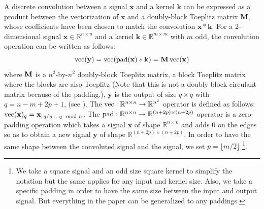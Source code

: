 A discrete convolution between a signal $\mathbf{x}$ and a kernel $\mathbf{k}$ can be expressed as a  product between the vectorization of $\mathbf{x}$ and a doubly-block Toeplitz matrix $\textbf{M}$, whose coefficients have been chosen to match the convolution $\mathbf{x} * \mathbf{k}$.
For a 2-dimensional signal $\mathbf{x} \in \mathbb{R}^{n \times n}$ and a kernel $\mathbf{k} \in \mathbb{R}^{m \times m}$ with $m$ odd, the convolution operation can be written as follows:
\begin{equation} \label{equation:equation_conv_as_matrix}
    \operatorname{vec}(\mathbf{y}) = \operatorname{vec}(\operatorname{pad}(\mathbf{x}) * \mathbf{k}) = \mathbf{M} \operatorname{vec}(\mathbf{x})
\end{equation}
where $\mathbf{M}$ is a $n^2$-by-$n^2$  doubly-block Toeplitz matrix, \ie a block Toeplitz matrix where the blocks are also Toeplitz (Note that this is not a doubly-block circulant matrix because of the padding.), $\mathbf{y}$ is the output of size $q \times q$ with $q = n - m + 2p + 1$, (see \eg \cite{dumoulin2016guide}).
The $\operatorname{vec}: \mathbb{R}^{n \times n} \rightarrow \mathbb{R}^{n^2}$ operator is defined as follows: $\operatorname{vec}(\mathbf{x})_q = \mathbf{x}_{\lfloor q/n \rfloor,\ q\mod n}$.
The $\operatorname{pad}: \mathbb{R}^{n \times n} \rightarrow \mathbb{R}^{(n+2p) \times (n+2p)}$ operator is a zero-padding operation which takes a signal $\mathbf{x}$ of shape $\mathbb{R}^{n \times n}$ and adds $0$ on the edges so as to obtain a new signal $\mathbf{y}$ of shape $\mathbb{R}^{(n+2p) \times (n+2p)}$.
In order to have the same shape between the convoluted signal and the signal, we set $ p = \lfloor m/2 \rfloor$ \footnote{We take a square signal and an odd size square kernel to simplify the notation but the same applies for any input and kernel size.
Also, we take a specific padding in order to have the same size between the input and output signal.
But everything in the paper can be generalized to any paddings.}.

